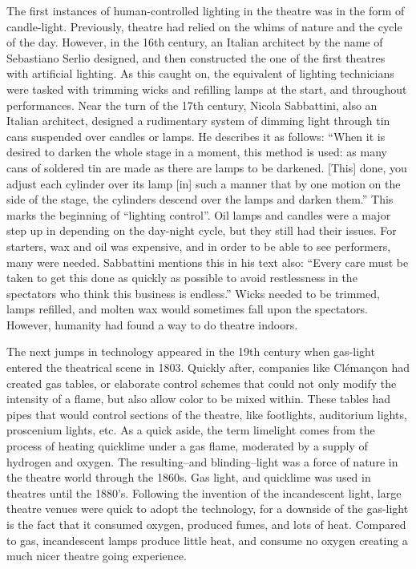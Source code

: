 \documentclass[12pt,twoside]{reedthesis}
\begin{document}
The first instances of human-controlled lighting in the theatre was in the form of candle-light. Previously, theatre had relied on the whims of nature and the cycle of the day. However, in the 16th century, an Italian architect by the name of Sebastiano Serlio designed, and then constructed the one of the first theatres with artificial lighting. As this caught on, the equivalent of lighting technicians were tasked with trimming wicks and refilling lamps at the start, and throughout performances. Near the turn of the 17th century, Nicola Sabbattini, also an Italian architect, designed a rudimentary system of dimming light through tin cans suspended over candles or lamps. He describes it as follows: “When it is desired to darken the whole stage in a moment, this method is used: as many cans of soldered tin are made as there are lamps to be darkened. [This] done, you adjust each cylinder over its lamp [in] such a manner that by one motion on the side of the stage, the cylinders descend over the lamps and darken them.” This marks the beginning of “lighting control”. 
Oil lamps and candles were a major step up in depending on the day-night cycle, but they still had their issues. For starters, wax and oil was expensive, and in order to be able to see performers, many were needed. Sabbattini mentions this in his text also: “Every care must be taken to get this done as quickly as possible to avoid restlessness in the spectators who think this business is endless.” Wicks needed to be trimmed, lamps refilled, and molten wax would sometimes fall upon the spectators. However, humanity had found a way to do theatre indoors.

The next jumps in technology appeared in the 19th century when gas-light entered the theatrical scene in 1803. Quickly after, companies like Clémançon had created gas tables, or elaborate control schemes that could not only modify the intensity of a flame, but also allow color to be mixed within. These tables had pipes that would control sections of the theatre, like footlights, auditorium lights, proscenium lights, etc. As a quick aside, the term limelight comes from the process of heating quicklime under a gas flame, moderated by a supply of hydrogen and oxygen. The resulting–and blinding–light was a force of nature in the theatre world through the 1860s. Gas light, and quicklime was used in theatres until the 1880’s. Following the invention of the incandescent light, large theatre venues were quick to adopt the technology, for a downside of the gas-light is the fact that it consumed oxygen, produced fumes, and lots of heat. Compared to gas, incandescent lamps produce little heat, and consume no oxygen creating a much nicer theatre going experience.
\end{document}
